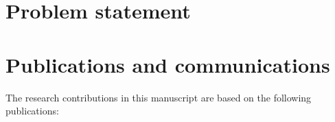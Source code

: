 \section*{Problem statement}


\cite{fekhari_ICASP_2023}



\newpage
\section*{Publications and communications}

The research contributions in this manuscript are based on the following publications: 

